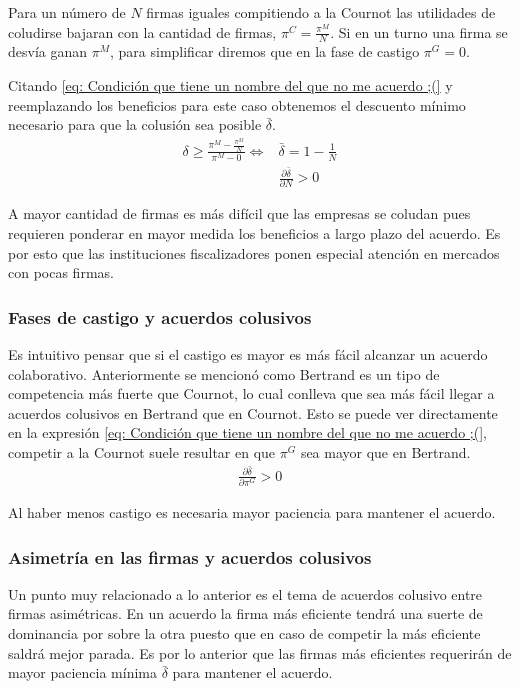 Para un número de $N$ firmas iguales compitiendo a la Cournot las utilidades de coludirse bajaran con la cantidad de firmas, $\pi^C = \frac{\pi^M}{N}$. Si en un turno una firma se desvía ganan $\pi^M$, para simplificar diremos que en la fase de castigo $\pi^G = 0$.

Citando \ref{eq: Condición que tiene un nombre del que no me acuerdo ;(} y reemplazando los beneficios para este caso obtenemos el descuento mínimo necesario para que la colusión sea posible $\bar{\delta}$. 
\begin{align*}
    \delta \geq \frac{\pi^M - \frac{\pi^M}{N}}{\pi ^M - 0} \Longleftrightarrow &\bar{\delta} = 1 - \frac{1}{N} \\
    & \frac{\partial \bar{\delta}}{\partial N} > 0
\end{align*}

A mayor cantidad de firmas es más difícil que las empresas se coludan pues requieren ponderar en mayor medida los beneficios a largo plazo del acuerdo. Es por esto que las instituciones fiscalizadores ponen especial atención en mercados con pocas firmas. 

\subsubsection*{Fases de castigo y acuerdos colusivos}

Es intuitivo pensar que si el castigo es mayor es más fácil alcanzar un acuerdo colaborativo. Anteriormente se mencionó como Bertrand es un tipo de competencia más fuerte que Cournot, lo cual conlleva que sea más fácil llegar a acuerdos colusivos en Bertrand que en Cournot. Esto se puede ver directamente en la expresión \ref{eq: Condición que tiene un nombre del que no me acuerdo ;(}, competir a la Cournot suele resultar en que $\pi^G$ sea mayor que en Bertrand. 
\begin{align*}
    \frac{\partial \bar{\delta}}{\partial \pi^G} > 0
\end{align*}

Al haber menos castigo es necesaria mayor paciencia para mantener el acuerdo. 

\subsubsection*{Asimetría en las firmas y acuerdos colusivos}

Un punto muy relacionado a lo anterior es el tema de acuerdos colusivo entre firmas asimétricas. En un acuerdo la firma más eficiente tendrá una suerte de dominancia por sobre la otra puesto que en caso de competir la más eficiente saldrá mejor parada. Es por lo anterior que las firmas más eficientes requerirán de mayor paciencia mínima $\bar{\delta}$ para mantener el acuerdo. 